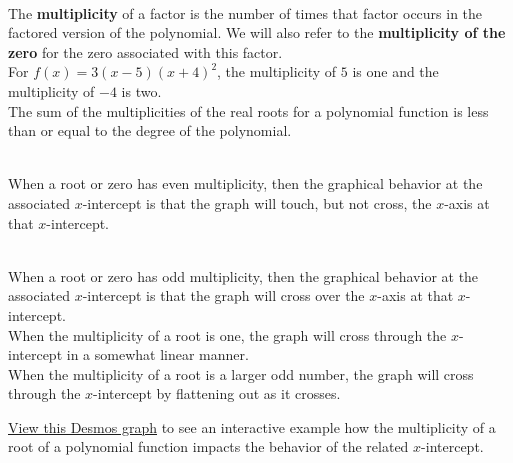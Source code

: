\begin{myDefinition}[Multiplicity]~\\[0.5mm]
The {\bf multiplicity} of a factor is the number of times that factor occurs in the factored version of the polynomial.  We will also refer to the {\bf multiplicity of the zero} for the zero associated with this factor.\\[0.5em]
 For $f(x) = 3(x-5)(x+4)^2$, the multiplicity of $5$ is one and the multiplicity of $-4$ is two.\\[0.5em]
The sum of the multiplicities of the real roots for a polynomial function is less than or equal to the degree of the polynomial.
\end{myDefinition}

\begin{myDefinition}~\\[0.5mm]
When a root or zero has even multiplicity, then the graphical behavior at the associated $x$-intercept is that the graph will touch, but not cross, the $x$-axis at that $x$-intercept.
\end{myDefinition}

\begin{myDefinition}~\\[0.5mm]
When a root or zero has odd multiplicity, then the graphical behavior at the associated $x$-intercept is that the graph will cross over the $x$-axis at that $x$-intercept.\\

When the multiplicity of a root is one, the graph will cross through the $x$-intercept in a somewhat linear manner.\\

When the multiplicity of a root is a larger odd number, the graph will cross through the $x$-intercept by flattening out as it crosses.\\

\begin{minipage}{0.9\linewidth}
 \href{https://tiny.cc/111Z-Multiplicity}{View this Desmos graph} to see an interactive example how the multiplicity of a root of a polynomial function impacts the behavior of the related $x$-intercept.  %
\end{minipage}
\begin{minipage}{0.1\linewidth}
\flushright {}
\end{minipage}
\end{myDefinition}



